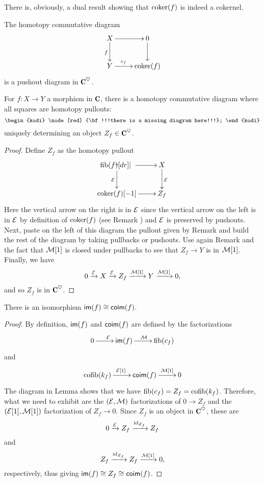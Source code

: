 \documentclass[a4paper,12pt]{amsart}
\begin{document}
There is, obviously, a dual result showing that $\operatorname{coker}(f)$ is indeed a cokernel.
\begin{lemma}
The homotopy commutative diagram
\[\xymatrix{
X\ar[r]\ar[d]_{f}&0\ar[d]\\
Y\ar[r]^-{c_f}&\coker(f)
}\]
is a pushout diagram in $\C^\heart$.
\end{lemma}
\begin{lemma}\label{lemma.titanic}
For $f\colon X\to Y$ a morphism in $\C$, there is a homotopy commutative diagram where all squares are homotopy pullouts:
\[
\begin{kodi}
\node[red] {\bf !!!there is a missing diagram here!!!};
\end{kodi}\]
uniquely determining an object $Z_f\in \C^\heart$.
\end{lemma}
\begin{proof}
Define $Z_f$ as the homotopy pullout
\[
\xymatrix{
\fib(f)\ar[r]\ar[d]_{\E} \pp & X\ar[d]^{\E}\\
\coker(f)[-1]\ar[r]& Z_f}
\]
Here the vertical arrow on the right is in $\mathcal{E}$ since the vertical arrow on the left is in $\mathcal{E}$ by definition of $\operatorname{coker}(f)$ (see Remark ) and $\mathcal{E}$ is preserved by pushouts. Next, paste on the left of this diagram the pullout given by Remark  and build the rest of the 
diagram by taking pullbacks or pushouts. Use again Remark  and the fact that $\mathcal{M}[1]$ is closed under pullbacks to see that $Z_f\to Y$ is in $\mathcal{M}[1]$. 
Finally, we have 
\[
0\xrightarrow{\mathcal{E}} X\xrightarrow{\mathcal{E}} Z_f\xrightarrow{\mathcal{M}[1]} Y\xrightarrow{\mathcal{M}[1]} 0,
\]
and so $Z_f$ is in $\C^\heart$.
\end{proof}
\begin{proposition}\label{im.iso.coim}
There is an isomorphism $\operatorname{\textsf{im}} (f)\cong\operatorname{\textsf{coim}} (f)$.\end{proposition}
\begin{proof}
By definition, $\operatorname{\textsf{im}}(f)$ and $\operatorname{\textsf{coim}}(f)$ are defined by the factorizations
\[
\xymatrix{
0\ar[r]^{\E}&\im(f)\ar[r]^{\M}&\fib(c_f)
}
\]
and
\[
\xymatrix{
\cofib(k_f)\ar[r]^{\E[1]}&\coim(f)\ar[r]^-{\M[1]} &0
}
\]
The diagram in Lemma  shows that we have $\operatorname{fib}(c_f)=Z_f=\operatorname{cofib}(k_f)$. Therefore, 
what we need to exhibit are the $(\mathcal{E},\mathcal{M})$ factorizations of $0\to Z_f$ and the $(\mathcal{E}[1],\mathcal{M}[1])$ factorization of $Z_f\to 0$. Since $Z_f$ is an object in $\C^\heart$, these are
\[
0\xrightarrow{\mathcal{E}}Z_f\xrightarrow{\mathrm{id}_{Z_f}}Z_f
\]
and 
\[
Z_f\xrightarrow{\mathrm{id}_{Z_f}}Z_f\xrightarrow{\mathcal{M}[1]}0,
\]
respectively, thus giving $\operatorname{\textsf{im}}(f)\cong Z_f\cong \operatorname{\textsf{coim}}(f)$.
\end{proof}
\end{document}
